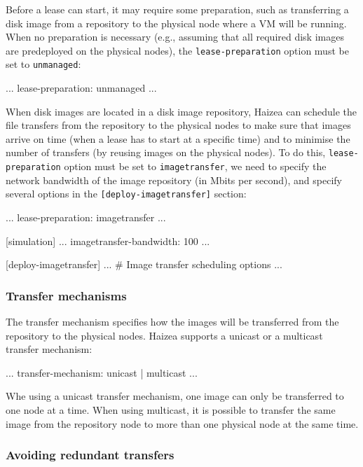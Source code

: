 Before a lease can start, it may require some preparation, such as transferring a disk image from a repository to the physical node where a VM will be running. When no preparation is necessary (e.g., assuming that all required disk images are predeployed on the physical nodes), the \texttt{lease-preparation} option must be set to \texttt{unmanaged}:

\begin{wideshellverbatim}
[general]
...
lease-preparation: unmanaged
...
\end{wideshellverbatim}

When disk images are located in a disk image repository, Haizea can schedule the file transfers from the repository to the physical nodes to make sure that images arrive on time (when a lease has to start at a specific time) and to minimise the number of transfers (by reusing images on the physical nodes). To do this, \texttt{lease-preparation} option must be set to \texttt{imagetransfer}, we need to specify the network bandwidth of the image repository (in Mbits per second), and specify several options in the \texttt{[deploy-imagetransfer]} section:

\begin{wideshellverbatim}
[general]
...
lease-preparation: imagetransfer
...

[simulation]
...
imagetransfer-bandwidth: 100
...

[deploy-imagetransfer]
...
\# Image transfer scheduling options
...
\end{wideshellverbatim}

\subsubsection{Transfer mechanisms}

The transfer mechanism specifies how the images will be transferred from the repository to the physical nodes. Haizea supports a unicast or a multicast transfer mechanism:

\begin{wideshellverbatim}
...
transfer-mechanism: unicast | multicast
...
\end{wideshellverbatim}

Whe using a unicast transfer mechanism, one image can only be transferred to one node at a time. When using multicast, it is possible to transfer the same image from the repository node to more than one physical node at the same time.

\subsubsection{Avoiding redundant transfers}

